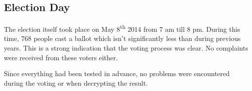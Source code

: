 \subsection{Election Day}

The election itself took place on May 8\textsuperscript{th} 2014 from 7 am till 8 pm. During this time, 768 people cast a ballot which isn't significantly less than during previous years. This is a strong indication that the voting process was clear. No complaints were received from these voters either.

\par Since everything had been tested in advance, no problems were encountered during the voting or when decrypting the result.
